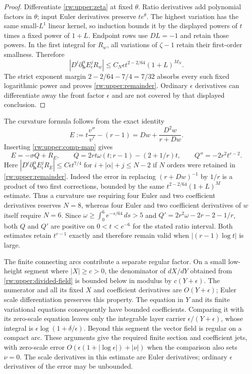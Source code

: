 \begin{proof}
Differentiate \eqref{rw:upper:zeta} at fixed $\theta$. Ratio derivatives
add polynomial factors in $\theta$; input Euler derivatives preserve
$te^\theta$. The highest variation has the same small-$L^1$ linear
kernel, so induction bounds it by the displayed powers of $t$ times a
fixed power of $1+L$. Endpoint rows use $DL=-1$ and retain those powers.
In the first integral for $R_w$, all variations of $\zeta-1$ retain
their first-order smallness. Therefore
\[
 |D^i\partial_{\mathbf b}^{\alpha}E_\epsilon^jR_w|
 \le C_N\epsilon t^{2-2/64}(1+L)^{M_N}.
\]
The strict exponent margin $2-2/64-7/4=7/32$ absorbs every such fixed
logarithmic power and proves \eqref{rw:upper:remainder}. Ordinary
$\epsilon$ derivatives can differentiate away the front factor
$\epsilon$ and are not covered by that displayed conclusion.
\end{proof}

The curvature formula follows from the exact identity
\[
 E:=t\frac{v''}{v'}-(r-1)=Dw+\frac{D^2w}{r+Dw}.
\]
Inserting \eqref{rw:upper:comp-map} gives
\begin{equation}\label{rw:upper:curvature}
 E=-\sigma Q+R_E,\qquad
 Q=2rt\omega(t;r-1)-(2+1/r)t,\qquad Q''=-2r^2t^{r-2}.
\end{equation}
Here $|D^i\partial_{\mathbf b}^{\alpha}E_\epsilon^jR_E|
\le C\epsilon t^{7/4}$ for $i+|\alpha|+j\le N-2$ if $N$ orders were
retained in \eqref{rw:upper:remainder}. Indeed the error in replacing
$(r+Dw)^{-1}$ by $1/r$ is a product of two first corrections, bounded
by the same $t^{2-2/64}(1+L)^M$ estimate. Thus a curvature use requiring
four Euler and two coefficient derivatives reserves $N=8$, whereas
four Euler and two coefficient derivatives of $w$ itself require
$N=6$. Since $\omega\ge\int_0^6e^{-s/64}\,ds>5$ and
$Q'=2r^2\omega-2r-2-1/r$, both $Q$ and $Q'$ are positive on
$0<t<e^{-6}$ for the stated ratio interval.  Both estimates retain
$t^{r-1}$ exactly and therefore remain valid when
$|(r-1)\log t|$ is large.

The finite connecting arcs contribute a separate regular factor. On a
small low-height segment where $|X|\ge c>0$, the denominator of
$dX/dY$ obtained from \eqref{rw:upper:divided-field} is bounded below
in modulus by $c(Y+\epsilon)$. The numerator and all its fixed $X$
and coefficient derivatives are $O(Y+\epsilon)$; Euler scale
differentiation preserves this property. The equation in $Y$ and its
finite variational equations consequently have bounded coefficients.
Comparing it with its zero-scale equation leaves only the integrable
layer carrier $\epsilon/(Y+\epsilon)$, whose integral is
$\epsilon\log(1+\delta/\epsilon)$. Beyond this segment the vector
field is regular on a compact arc. These arguments give the required
finite section and coefficient jets, with zero-scale error
$O(\epsilon(1+|\log\epsilon|)+|\nu|)$ when the comparison also sets
$\nu=0$.  The scale derivatives in this estimate are Euler
derivatives; ordinary $\epsilon$ derivatives of the error may be
unbounded.

